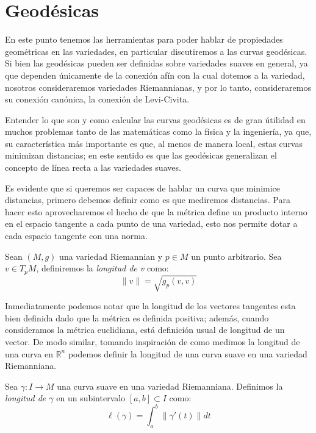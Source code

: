 \section{Geodésicas}\label{Sección: Geodésicas}
En este punto tenemos las herramientas para poder hablar de propiedades geométricas en las variedades, en particular discutiremos a las curvas geodésicas. Si bien las geodésicas pueden ser definidas sobre variedades suaves en general, ya que dependen únicamente de la conexión afín con la cual dotemos a la variedad, nosotros consideraremos variedades Riemannianas, y por lo tanto, consideraremos su conexión canónica, la conexión de Levi-Civita.

Entender lo que son y como calcular las curvas geodésicas es de gran útilidad en muchos problemas tanto de las matemáticas como la física y la ingeniería, ya que, su característica más importante es que, al menos de manera local, estas curvas minimizan distancias; en este sentido es que las geodésicas generalizan el concepto de línea recta a las variedades suaves.

Es evidente que si queremos ser capaces de hablar un curva que minimice distancias, primero debemos definir como es que mediremos distancias. Para hacer esto aprovecharemos el hecho de que la métrica define un producto interno en el espacio tangente a cada punto de una variedad, esto nos permite dotar a cada espacio tangente con una norma.

\begin{definition}
	Sean $(M,g)$ una variedad Riemannian y $p \in M$ un punto arbitrario. Sea $v \in T_{p}M$, definiremos la \textit{longitud de v} como:
	\[
		\|v\| = \sqrt{g_{p}(v,v)}
	\]
\end{definition}
Inmediatamente podemos notar que la longitud de los vectores tangentes esta bien definida dado que la métrica es definida positiva; además, cuando consideramos la métrica euclidiana, está definición usual de longitud de un vector. De modo similar, tomando inspiración de como medimos la longitud de una curva en $\mathbb{R}^{n}$ podemos definir la longitud de una curva suave en una variedad Riemanniana.
\begin{definition}
	Sea $\gamma: I \to M$ una curva suave en una variedad Riemanniana. Definimos la \textit{longitud de $\gamma$} en un subintervalo $[a,b] \subset I$ como:
	\[
		\ell(\gamma) = \int_{a}^{b} \|\gamma'(t)\| dt
	\]
\end{definition}

